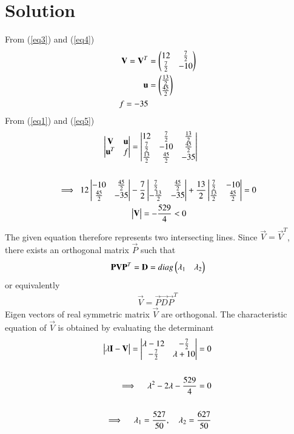 \documentclass[journal,12pt,twocolumn]{IEEEtran}
\begin{document}
\section{Solution}
From (\ref{eq3}) and (\ref{eq4})
\begin{align}
	\mathbf{V}=\mathbf{V}^T &= \begin{pmatrix}12 & \frac{7}{2} \\ \frac{7}{2} & -10\end{pmatrix} \\
	\mathbf{u} &= \begin{pmatrix}\frac{13}{2} \\ \frac{45}{2}\end{pmatrix} \\
	 f=-35
\end{align}
From (\ref{eq1}) and (\ref{eq5})
\begin{align}
	\begin{vmatrix}\mathbf{V} & \mathbf{u} \\ \mathbf{u}^T & f\end{vmatrix} 
		&= \begin{vmatrix}12 & \frac{7}{2}  & \frac{13}{2} \\ 
	        \frac{7}{2} & -10 & \frac{45}{2}     \\
	       \frac{13}{2} & \frac{45}{2} & -35 \end{vmatrix}  \\
	       		\nonumber \\
	\implies \ 12\begin{vmatrix}-10 & \frac{45}{2} \\ \frac{45}{2} & -35\end{vmatrix} 
		& -\frac{7}{2}\begin{vmatrix}\frac{7}{2} & \frac{45}{2} \\ -\frac{13}{2} & -35\end{vmatrix} 
		+\frac{13}{2}\begin{vmatrix}\frac{7}{2} & -10 \\ \frac{13}{2} & \frac{45}{2}\end{vmatrix} = 0 \\
	& \begin{vmatrix}\mathbf{V}\end{vmatrix}=-\frac{529}{4} < 0
\end{align}
The given equation therefore represents two intersecting lines.
Since $ \vec{V} = \vec{V}^T $, there exists an orthogonal matrix $\vec{P}$ such that
\begin{align}
	\mathbf{P}\mathbf{V}\mathbf{P}^T = \mathbf{D} = diag\begin{pmatrix}\lambda_1 & \lambda_2\end{pmatrix}
\end{align}
or equivalently 
\begin{align}
	\vec{V} = \vec{P}\vec{D}\vec{P}^T
\end{align}
Eigen vectors of real symmetric matrix $\vec{V}$ are orthogonal. The characteristic equation of $\vec{V}$ is obtained by evaluating the determinant
\begin{align}
	\begin{vmatrix}\lambda\mathbf{I}-\mathbf{V}\end{vmatrix}=\begin{vmatrix}\lambda-12 & -\frac{7}{2} \\ -\frac{7}{2} & \lambda +10\end{vmatrix} = 0 \\ 
			\nonumber \\
	\implies \quad \lambda^2-2\lambda-\frac{529}{4}=0 \\
			\nonumber \\
	\implies \quad \lambda_1=\frac{527}{50},\quad \lambda_2=\frac{627}{50}
\end{align}
\end{document}
